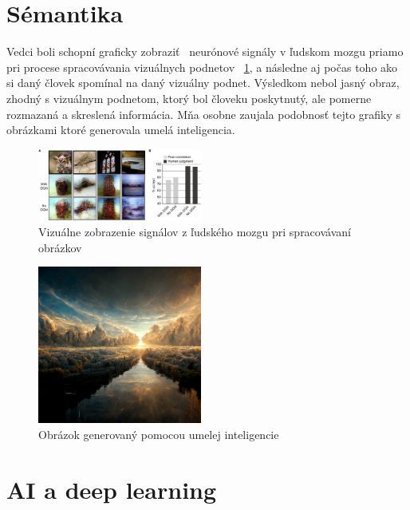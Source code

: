 \documentclass[10pt,twoside,slovak,a4paper]{article}
\begin{document}
\section{Sémantika} \label{09}
Vedci boli schopní graficky zobraziť~\cite{Deep_image_reconstruction_from_human_brain_activity } neurónové signály v ľudskom mozgu priamo pri procese spracovávania vizuálnych podnetov ~\ref{brain}, a následne aj počas toho ako si daný človek spomínal na daný vizuálny podnet. Výsledkom nebol jasný obraz, zhodný s vizuálnym podnetom, ktorý bol človeku poskytnutý, ale pomerne rozmazaná a skreslená informácia. Mňa osobne zaujala podobnosť tejto grafiky s obrázkami ktoré generovala umelá inteligencia. 
\begin{figure}[htb!]\label{brain}
  \centering
  \includegraphics[width=0.48\textwidth]{images/brain_image.png} 
  \caption{Vizuálne zobrazenie signálov z ľudského mozgu pri spracovávaní obrázkov}
\end{figure}
\begin{figure}[htb!]\label{AI_prompt}
  \centering
  \includegraphics[width=0.48\textwidth]{images/AI_prompt.png} 
  \caption{Obrázok generovaný pomocou umelej inteligencie}
\end{figure}


\section{AI a deep learning} \label{10}
\end{document}
